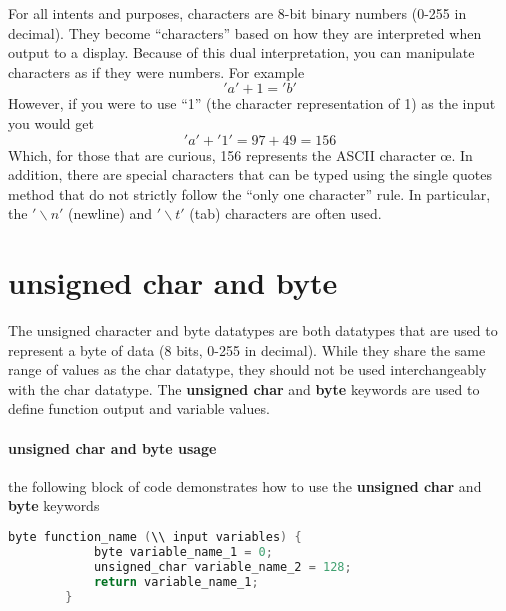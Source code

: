     \begin{kaobox}[frametitle=Aside: Some quirks with characters]
        For all intents and purposes, characters are 8-bit binary numbers (0-255 in decimal). They become \enquote{characters} based on how they are interpreted when output to
        a display. Because of this dual interpretation, you can manipulate characters as if they were numbers. For example
        \begin{equation*}
            'a' + 1 = 'b'
        \end{equation*}
        However, if you were to use \enquote{1} (the character representation of 1) as the input you would get
        \begin{equation*}
            'a' + '1' = 97 + 49 = 156
        \end{equation*} 
        Which, for those that are curious, 156 represents the ASCII character \oe. In addition, there are special characters that can be typed using the single quotes 
        method that do not strictly follow the \enquote{only one character} rule. In particular, the $'\backslash n'$ (newline) and $'\backslash t'$ (tab) characters are often used.
    \end{kaobox}

    \section{unsigned char and byte}
    The unsigned character and byte datatypes are both datatypes that are used to represent a byte of data (8 bits, 0-255 in decimal). While they share the same range of values
    as the char datatype, they should not be used interchangeably with the char datatype. The \textbf{unsigned char} and \textbf{byte} keywords are used to define function output
    and variable values.
    \paragraph*{unsigned char and byte usage} the following block of code demonstrates how to use the \textbf{unsigned char} and \textbf{byte} keywords
    \begin{lstlisting}[linewidth=1.5\textwidth, language=C++]
        byte function_name (\\ input variables) {
            byte variable_name_1 = 0;
            unsigned_char variable_name_2 = 128;
            return variable_name_1;
        }\end{lstlisting}
